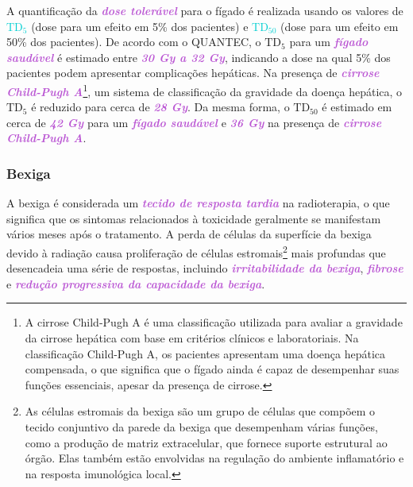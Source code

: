 \documentclass[11pt,a4paper]{article}
\begin{document}
	A quantificação da \textcolor{MediumOrchid}{\textbf{\textit{dose tolerável}}} para o fígado é realizada usando os valores de \textcolor{DarkTurquoise}{\textbf{\textit{$\text{TD}_5$}}} (dose para um efeito em 5\% dos pacientes) e \textcolor{DarkTurquoise}{\textbf{\textit{$\text{TD}_50$}}} (dose para um efeito em 50\% dos pacientes). De acordo com o QUANTEC, o $\text{TD}_5$ para um \textcolor{MediumOrchid}{\textbf{\textit{fígado saudável}}} é estimado entre \textcolor{MediumOrchid}{\textbf{\textit{30 Gy a 32 Gy}}}, indicando a dose na qual 5\% dos pacientes podem apresentar complicações hepáticas. Na presença de \textcolor{MediumOrchid}{\textbf{\textit{cirrose Child-Pugh A}}}\footnote{A cirrose Child-Pugh A é uma classificação utilizada para avaliar a gravidade da cirrose hepática com base em critérios clínicos e laboratoriais. Na classificação Child-Pugh A, os pacientes apresentam uma doença hepática compensada, o que significa que o fígado ainda é capaz de desempenhar suas funções essenciais, apesar da presença de cirrose.}, um sistema de classificação da gravidade da doença hepática, o $\text{TD}_5$ é reduzido para cerca de \textcolor{MediumOrchid}{\textbf{\textit{28 Gy}}}. Da mesma forma, o $\text{TD}_50$ é estimado em cerca de \textcolor{MediumOrchid}{\textbf{\textit{42 Gy}}} para um \textcolor{MediumOrchid}{\textbf{\textit{fígado saudável}}} e \textcolor{MediumOrchid}{\textbf{\textit{36 Gy}}} na presença de \textcolor{MediumOrchid}{\textbf{\textit{cirrose Child-Pugh A}}}.

\subsubsection*{Bexiga}

	A bexiga é considerada um \textcolor{MediumOrchid}{\textbf{\textit{tecido de resposta tardia}}} na radioterapia, o que significa que os sintomas relacionados à toxicidade geralmente se manifestam vários meses após o tratamento. A perda de células da superfície da bexiga devido à radiação causa proliferação de células estromais\footnote{As células estromais da bexiga são um grupo de células que compõem o tecido conjuntivo da parede da bexiga que  desempenham várias funções, como a produção de matriz extracelular, que fornece suporte estrutural ao órgão. Elas também estão envolvidas na regulação do ambiente inflamatório e na resposta imunológica local.} mais profundas que desencadeia uma série de respostas, incluindo \textcolor{MediumOrchid}{\textbf{\textit{irritabilidade da bexiga}}}, \textcolor{MediumOrchid}{\textbf{\textit{fibrose}}} e \textcolor{MediumOrchid}{\textbf{\textit{redução progressiva da capacidade da bexiga}}}.
\end{document}
